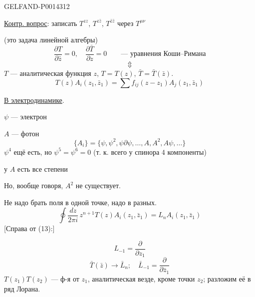 \begin{GelfandAdjacentEvidence}{GELFAND-P001431}{2}


\uline{Контр. вопрос}: записать \(T^{zz}\), \(T^{z\bar z}\), \(T^{\bar z\bar z}\)
через \(T^{\mu\nu}\)

(это задача линейной алгебры)
\begin{equation*}
\tag{11}
\frac{\partial T}{\partial\bar z}=0,\quad
\frac{\partial\bar T}{\partial z}=0
\qquad\text{— уравнения Коши–Римана}
\end{equation*}
\[
\Updownarrow
\]
\(T\) — аналитическая функция \(z\), \(T=T(z)\), \(\bar T=\bar T(\bar z)\).
\begin{equation*}
\tag{12}
T(z)A_i(z_1,\bar z_1)=\sum f_{ij}(z-z_1)A_j(z_1,\bar z_1)
\end{equation*}

\uline{В электродинамике}.

\(\psi\) — электрон

\(A\) — фотон
\[
\{A_i\}=\{\psi,\psi^2,\psi\partial\psi,\ldots,A,A^2,A\psi,\ldots\}
\]
\(\psi^4\) ещё есть, но \(\psi^5=\psi^6=0\) (т. к. всего у спинора 4 компоненты)

у \(A\) есть все степени

Но, вообще говоря, \(A^2\) не существует.

Не надо брать поля в одной точке, надо в разных.
\begin{equation*}
\tag{13}
\oint\frac{dz}{2\pi i}\,z^{n+1}T(z)A_i(z_1,\bar z_1)
=L_nA_i(z_1,\bar z_1)
\end{equation*}
[Справа от (13):]
\end{GelfandAdjacentEvidence}

\[
L_{-1}=\frac{\partial}{\partial z_1}
\]
\begin{equation*}
\tag{14}
\bar T(\bar z)\to\bar L_n;\quad
\bar L_{-1}=\frac{\partial}{\partial\bar z_1}
\end{equation*}
\(T(z_1)T(z_2)\) — ф-я от \(z_1\), аналитическая везде, кроме точки \(z_2\);
разложим её в ряд Лорана.


